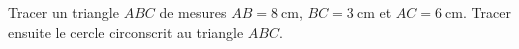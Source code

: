 
\begin{exercice}\label{exosmath-0923}

    Tracer un triangle \( ABC\) de mesures \( AB=\SI{8}{\centi\meter}\), \( BC=\SI{3}{\centi\meter}\) et \( AC=\SI{6}{\centi\meter}\). Tracer ensuite le cercle circonscrit au triangle \( ABC\).

\end{exercice}
